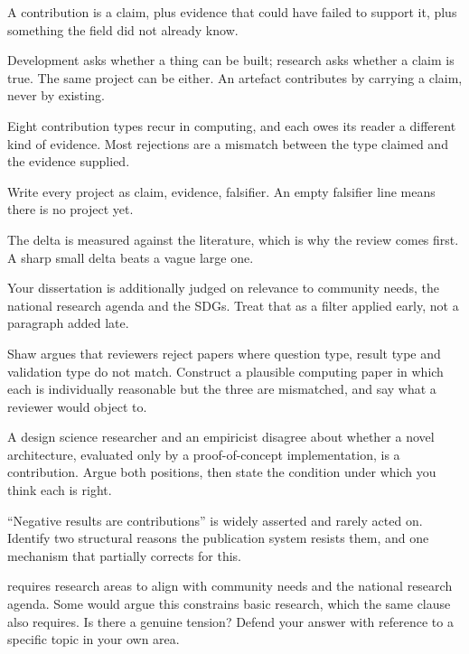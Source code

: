 \begin{chaptersummary}
\begin{tight}
  \item A contribution is a claim, plus evidence that could have failed to
    support it, plus something the field did not already know.
  \item Development asks whether a thing can be built; research asks whether a
    claim is true. The same project can be either. An artefact contributes by
    carrying a claim, never by existing.
  \item Eight contribution types recur in computing, and each owes its reader a
    different kind of evidence. Most rejections are a mismatch between the type
    claimed and the evidence supplied.
  \item Write every project as claim, evidence, falsifier. An empty falsifier
    line means there is no project yet.
  \item The delta is measured against the literature, which is why the review
    comes first. A sharp small delta beats a vague large one.
  \item Your dissertation is additionally judged on relevance to community
    needs, the national research agenda and the SDGs. Treat that as a filter
    applied early, not a paragraph added late.
\end{tight}
\end{chaptersummary}

\begin{reviewq}
  \item Shaw argues that reviewers reject papers where question type, result
    type and validation type do not match. Construct a plausible computing
    paper in which each is individually reasonable but the three are mismatched,
    and say what a reviewer would object to.
  \item A design science researcher and an empiricist disagree about whether a
    novel architecture, evaluated only by a proof-of-concept implementation,
    is a contribution. Argue both positions, then state the condition under
    which you think each is right.
  \item ``Negative results are contributions'' is widely asserted and rarely
    acted on. Identify two structural reasons the publication system resists
    them, and one mechanism that partially corrects for this.
  \item {} requires research areas to align with
    community needs and the national research agenda. Some would argue this
    constrains basic research, which the same clause also requires. Is there a
    genuine tension? Defend your answer with reference to a specific topic in
    your own area.
\end{reviewq}
